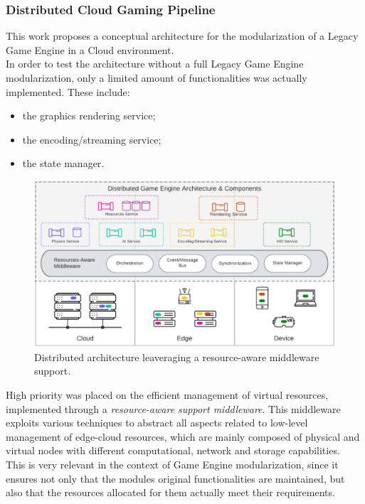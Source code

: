 \subsubsection{Distributed Cloud Gaming Pipeline}
This work proposes a conceptual architecture for the modularization of a Legacy Game Engine in a Cloud environment. \\
In order to test the architecture without a full Legacy Game Engine modularization, only a limited amount of functionalities was actually implemented. These include:
\begin{itemize}
	\item the graphics rendering service;
	\item the encoding/streaming service;
	\item the state manager.
\end{itemize}
\begin{figure}[h!]
	\centering
	\includegraphics[width=1\linewidth]{immagini/State-of-the-art/resource-aware-middleware-architecture}
	\caption[Distributed architecture leaveraging a resource-aware middleware support.]{Distributed architecture leaveraging a resource-aware middleware support.}
	\label{fig:resource-aware-middleware-architecture}
\end{figure}
High priority was placed on the efficient management of virtual resources, implemented through a \textit{resource-aware support middleware}. This middleware exploits various techniques to abstract all aspects related to low-level management of edge-cloud resources, which are mainly composed of physical and virtual nodes with different computational, network and storage capabilities. \\
This is very relevant in the context of Game Engine modularization, since it ensures not only that the modules original functionalities are maintained, but also that the resources allocated for them actually meet their requirements. \\ \\
